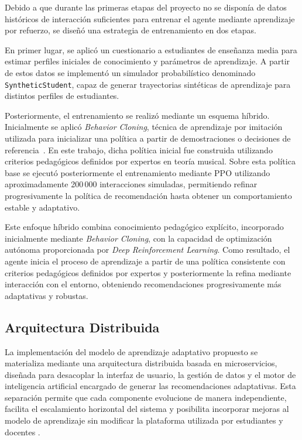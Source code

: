 Debido a que durante las primeras etapas del proyecto no se disponía de datos históricos de interacción suficientes para entrenar el agente mediante aprendizaje por refuerzo, se diseñó una estrategia de entrenamiento en dos etapas.

En primer lugar, se aplicó un cuestionario a estudiantes de enseñanza media para estimar perfiles iniciales de conocimiento y parámetros de aprendizaje. A partir de estos datos se implementó un simulador probabilístico denominado \texttt{SyntheticStudent}, capaz de generar trayectorias sintéticas de aprendizaje para distintos perfiles de estudiantes.

Posteriormente, el entrenamiento se realizó mediante un esquema híbrido. Inicialmente se aplicó \textit{Behavior Cloning}, técnica de aprendizaje por imitación utilizada para inicializar una política a partir de demostraciones o decisiones de referencia~\cite{osa2018imitation}. En este trabajo, dicha política inicial fue construida utilizando criterios pedagógicos definidos por expertos en teoría musical. Sobre esta política base se ejecutó posteriormente el entrenamiento mediante PPO utilizando aproximadamente 200\,000 interacciones simuladas, permitiendo refinar progresivamente la política de recomendación hasta obtener un comportamiento estable y adaptativo.

Este enfoque híbrido combina conocimiento pedagógico explícito, incorporado inicialmente mediante \textit{Behavior Cloning}, con la capacidad de optimización autónoma proporcionada por \textit{Deep Reinforcement Learning}. Como resultado, el agente inicia el proceso de aprendizaje a partir de una política consistente con criterios pedagógicos definidos por expertos y posteriormente la refina mediante interacción con el entorno, obteniendo recomendaciones progresivamente más adaptativas y robustas.

\subsection{Arquitectura Distribuida}

La implementación del modelo de aprendizaje adaptativo propuesto se materializa mediante una arquitectura distribuida basada en microservicios, diseñada para desacoplar la interfaz de usuario, la gestión de datos y el motor de inteligencia artificial encargado de generar las recomendaciones adaptativas. Esta separación permite que cada componente evolucione de manera independiente, facilita el escalamiento horizontal del sistema y posibilita incorporar mejoras al modelo de aprendizaje sin modificar la plataforma utilizada por estudiantes y docentes \cite{charland_mobile_2011,flutter_vs_ionic_2023}.

